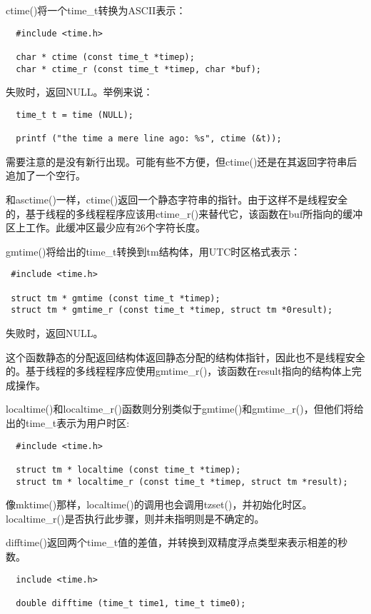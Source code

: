 ctime()将一个time\_t转换为ASCII表示： 

\begin{lstlisting}
  #include <time.h>

  char * ctime (const time_t *timep);
  char * ctime_r (const time_t *timep, char *buf);
\end{lstlisting}

失败时，返回NULL。举例来说：

\begin{lstlisting}
  time_t t = time (NULL);

  printf ("the time a mere line ago: %s", ctime (&t));
\end{lstlisting}

需要注意的是没有新行出现。可能有些不方便，但ctime()还是在其返回字符串后追加了一个空行。

和asctime()一样，ctime()返回一个静态字符串的指针。由于这样不是线程安全的，基于线程的多线程程序应该用ctime\_r()来替代它，该函数在buf所指向的缓冲区上工作。此缓冲区最少应有26个字符长度。 

gmtime()将给出的time\_t转换到tm结构体，用UTC时区格式表示： 

\begin{lstlisting}
 #include <time.h>

 struct tm * gmtime (const time_t *timep);
 struct tm * gmtime_r (const time_t *timep, struct tm *0result);
\end{lstlisting}

失败时，返回NULL。

这个函数静态的分配返回结构体返回静态分配的结构体指针，因此也不是线程安全的。基于线程的多线程程序应使用gmtime\_r()，该函数在result指向的结构体上完成操作。

localtime()和localtime\_r()函数则分别类似于gmtime()和gmtime\_r()，但他们将给出的time\_t表示为用户时区: 

\begin{lstlisting}
  #include <time.h>

  struct tm * localtime (const time_t *timep);
  struct tm * localtime_r (const time_t *timep, struct tm *result);
\end{lstlisting}

像mktime()那样，localtime()的调用也会调用tzset()，并初始化时区。localtime\_r()是否执行此步骤，则并未指明则是不确定的。

difftime()返回两个time\_t值的差值，并转换到双精度浮点类型来表示相差的秒数。 

\begin{lstlisting}
  include <time.h>

  double difftime (time_t time1, time_t time0);
\end{lstlisting}

